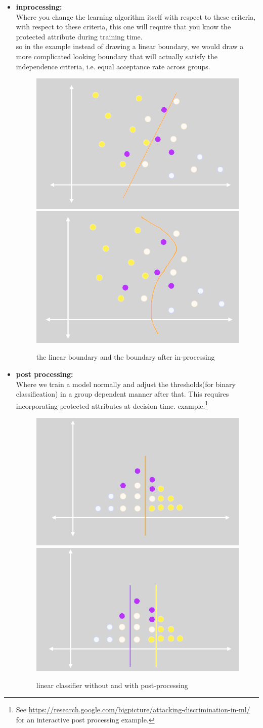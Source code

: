 \begin{itemize}
    \item \textbf{inprocessing:}\\
     Where you change the learning algorithm itself with respect to these criteria, with respect to these criteria, this one will require that you know the protected attribute during training time.\\
     so in the example instead of drawing a linear boundary, we would draw a more complicated looking boundary that will actually satisfy the independence criteria, i.e. equal acceptance rate across groups.
    \begin{figure}
    \centering
    \includegraphics[width=.3\textwidth]{graphics/p4.png}
    \includegraphics[width=.3\textwidth]{graphics/p3.png}
    \caption{the linear boundary and the boundary after in-processing}
    \end{figure}
    \item \textbf{post processing:}\\ Where we train a model normally and adjust the thresholds(for binary classification) in a group dependent manner after that. This requires incorporating protected attributes at decision time. example.\footnote{See \url{https://research.google.com/bigpicture/attacking-discrimination-in-ml/} for an interactive post processing example.}
    \vspace{10mm}
    \begin{figure}
    \centering
    \includegraphics[width=.3\textwidth]{graphics/p5.png}
    \includegraphics[width=.3\textwidth]{graphics/p6.png}
    \caption{linear classifier without and with post-processing}
    \end{figure}
\end{itemize}
